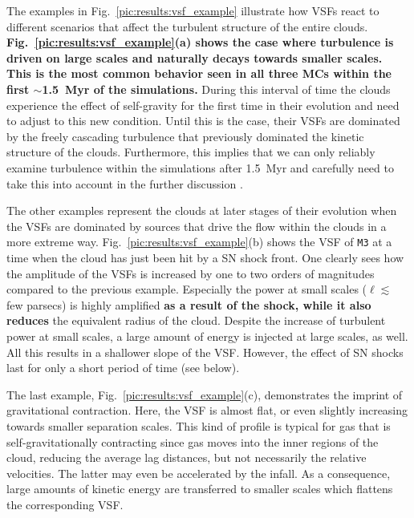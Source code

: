 The examples in Fig.~\ref{pic:results:vsf_example} illustrate how 
VSFs react to different scenarios that affect the turbulent structure of the entire clouds. 
\textbf{Fig.~\ref{pic:results:vsf_example}(a) shows the case where turbulence is driven on large scales and naturally decays towards smaller scales.
This is the most common behavior seen in all three MCs within the first $\sim$1.5~Myr of the simulations.}
During this interval of time the clouds experience the effect of self-gravity for the first time in their evolution and need to adjust to this new condition.
Until this is the case, their VSFs are dominated by the freely cascading turbulence that previously dominated the kinetic structure of the clouds.
Furthermore, this implies that we can only reliably examine turbulence within the simulations after 1.5~Myr and carefully need to take this into account in the further discussion \citep[see][]{IbanezMejia2017,Seifried2017b}.

The other examples represent the clouds at later stages of their evolution when the VSFs are dominated by sources that drive the 
   flow
within the clouds in a more extreme way.
Fig.~\ref{pic:results:vsf_example}(b) shows the VSF of \texttt{M3} at a time when the cloud has just been hit by a SN shock front. 
One clearly sees how the amplitude of the VSFs is increased by one to two orders of magnitudes compared to the previous example.
Especially the power 
    at small scales ($\ell \lesssim$ few parsecs) is highly amplified \textbf{as a result of the shock, while it also reduces} the equivalent radius of the cloud.
Despite the increase of turbulent power at small scales, a large amount of energy is injected at large scales, as well.
All this results in a 
     shallower slope of the VSF.
However, the effect of SN shocks last for only a short period of time (see below).

The last example, Fig.~\ref{pic:results:vsf_example}(c), demonstrates the imprint of gravitational contraction.
Here, the VSF is almost flat, or even slightly increasing towards smaller separation scales. 
This kind of profile is typical for gas that is self-gravitationally contracting \citep{Boneberg2015,Burkhart2015} since gas moves into the inner regions of the cloud, reducing the average lag distances, but not necessarily the relative velocities.
The latter may even be accelerated by the infall.
As a consequence, large amounts of kinetic energy are transferred to smaller scales which flattens the corresponding VSF.

